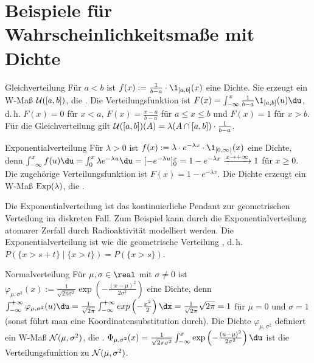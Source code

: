 \section{%
    Beispiele für Wahrscheinlichkeitsmaße mit Dichte%
}

\begin{Def}{Gleichverteilung}
    Für $a < b$ ist $f(x) := \frac{1}{b - a} \cdot \1_{[a,b]}(x)$ eine Dichte.
    Sie erzeugt ein W-Maß $\mathcal{U}([a, b])$,
    die .
    Die Verteilungsfunktion ist $F(x) = \int_{-\infty}^x \frac{1}{b - a} \1_{[a, b]}(u) \du$,
    d.\,h. $F(x) = 0$ für $x < a$, $F(x) = \frac{x - a}{b - a}$ für $a \le x \le b$
    und $F(x) = 1$ für $x > b$.
    Für die Gleichverteilung gilt $\mathcal{U}([a, b])(A) = \lambda(A \cap [a, b]) \cdot \frac{1}{b - a}$.
\end{Def}

\linie

\begin{Def}{Exponentialverteilung}
    Für $\lambda > 0$ ist $f(x) := \lambda \cdot e^{-\lambda x} \cdot \1_{[0, \infty)}(x)$
    eine Dichte, denn $\int_{-\infty}^x f(u)\du = \int_0^x \lambda e^{-\lambda u} \du =
    [-e^{-\lambda u}]_0^x = 1 - e^{-\lambda x} \xrightarrow{x \to +\infty} 1$ für $x \ge 0$.
    Die zugehörige Verteilungsfunktion ist $F(x) = 1 - e^{-\lambda x}$.
    Die Dichte erzeugt ein W-Maß $\text{Exp}(\lambda)$,
    die .
\end{Def}

\begin{Bem}
    Die Exponentialverteilung ist das kontinuierliche Pendant zur geometrischen Verteilung im
    diskreten Fall.
    Zum Beispiel kann durch die Exponentialverteilung atomarer Zerfall durch Radioaktivität
    modelliert werden.
    Die Exponentialverteilung ist wie die geometrische Verteilung , d.\,h.
    $P(\{x > s + t\} \;|\; \{x > t\}) = P(\{x > s\})$.
\end{Bem}

\linie

\begin{Def}{Normalverteilung}
    Für $\mu, \sigma \in \real$ mit $\sigma \not= 0$ ist
    $\varphi_{\mu,\sigma^2}(x) := \frac{1}{\sqrt{2\pi\sigma^2}}
    \exp\left(-\frac{(x - \mu)^2}{2\sigma^2}\right)$ eine Dichte,
    denn $\int_{-\infty}^{+\infty} \varphi_{\mu,\sigma^2}(u)\du =
    \frac{1}{\sqrt{2\pi}} \int_{-\infty}^{+\infty} exp\left(-\frac{x^2}{2}\right)\dx =
    \frac{1}{\sqrt{2\pi}} \sqrt{2\pi} = 1$ für $\mu = 0$ und $\sigma = 1$
    (sonst führt man eine Koordinatensubstitution durch).
    Die Dichte $\varphi_{\mu,\sigma^2}$ definiert ein W-Maß $\mathcal{N}(\mu, \sigma^2)$,
    die .
    $\Phi_{\mu,\sigma^2}(x) = \frac{1}{\sqrt{2\pi\sigma^2}}
    \int_{-\infty}^x \exp\left(-\frac{(u - \mu)^2}{2\sigma^2}\right) \du$
    ist die Verteilungsfunktion zu $\mathcal{N}(\mu, \sigma^2)$.
\end{Def}

